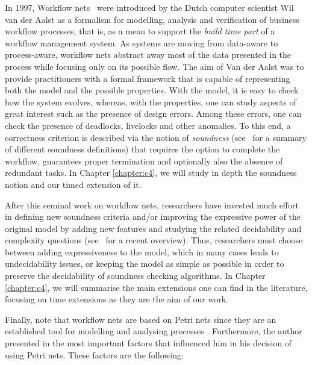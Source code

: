 In 1997, Workflow nets~\cite{Aalst97,Aalst98} were introduced 
by the Dutch computer scientist Wil van der Aalst as a formalism
for modelling, analysis and verification of business workflow processes, that is, as a mean to support
the \emph{build time part} of a workflow management system.
As systems are moving from data-aware to process-aware, workflow nets abstract away most of the data  presented in the process
while focusing only on its possible flow. The aim of Van der Aalst was to provide practitioners with 
a formal framework that is capable of representing both the model and the possible properties. With the model, 
it is easy to check how the system evolves, whereas, with the properties, one can study aspects of great interest such as 
the presence of design errors. Among these errors, one can check the presence of deadlocks, livelocks 
and other anomalies. To this end, a correctness criterion is described
via the notion of \emph{soundness} (see~\cite{AalstHHSVVW11} for a summary of different soundness definitions) that
requires the option to complete the workflow, guarantees proper termination
and optionally also the absence of redundant tasks. In Chapter \ref{chapter:c4}, we will study in depth the soundness notion and
our timed extension of it. 

After this seminal work on workflow nets, researchers have 
invested much effort in defining new soundness criteria and/or 
improving the expressive power of the original model by adding new features 
and studying the related decidability and 
complexity questions
(see~\cite{AalstHHSVVW11} for a recent overview). Thus, researchers must choose between 
adding expressiveness to the model, which in many cases leads to undecidability issues, or keeping the model as simple as possible
in order to preserve the decidability of soundness checking algorithms. In Chapter \ref{chapter:c4}, we will summarise the main extensions one can find in the literature, focusing
on time extensions as they are the aim of our work.

Finally, note that workflow nets are based on Petri nets since they are an established tool 
for modelling and analysing processes \cite{Aalst97}. Furthermore, the author presented in \cite{Aalst97} the most important factors
that influenced him in his decision of using Petri nets. These factors are the following:


